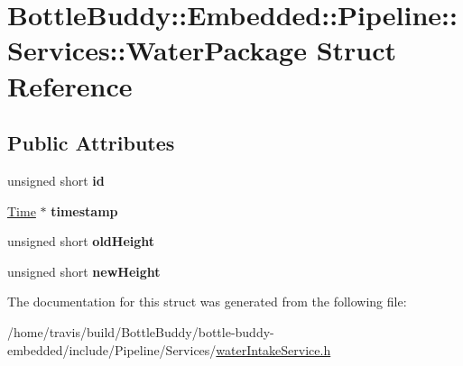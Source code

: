 \hypertarget{struct_bottle_buddy_1_1_embedded_1_1_pipeline_1_1_services_1_1_water_package}{}\section{Bottle\+Buddy\+:\+:Embedded\+:\+:Pipeline\+:\+:Services\+:\+:Water\+Package Struct Reference}
\label{struct_bottle_buddy_1_1_embedded_1_1_pipeline_1_1_services_1_1_water_package}
\subsection*{Public Attributes}
\begin{DoxyCompactItemize}
\item 
unsigned short {\bfseries id}\hypertarget{struct_bottle_buddy_1_1_embedded_1_1_pipeline_1_1_services_1_1_water_package_ae73a2f28e310cd2d842b18610f0e8c02}{}\label{struct_bottle_buddy_1_1_embedded_1_1_pipeline_1_1_services_1_1_water_package_ae73a2f28e310cd2d842b18610f0e8c02}

\item 
\hyperlink{struct_bottle_buddy_1_1_embedded_1_1_pipeline_1_1_services_1_1_time}{Time} $\ast$ {\bfseries timestamp}\hypertarget{struct_bottle_buddy_1_1_embedded_1_1_pipeline_1_1_services_1_1_water_package_a2184abfff14e71c5301a4590bb553443}{}\label{struct_bottle_buddy_1_1_embedded_1_1_pipeline_1_1_services_1_1_water_package_a2184abfff14e71c5301a4590bb553443}

\item 
unsigned short {\bfseries old\+Height}\hypertarget{struct_bottle_buddy_1_1_embedded_1_1_pipeline_1_1_services_1_1_water_package_a4a5e2f79dc583245575105370aee3c2a}{}\label{struct_bottle_buddy_1_1_embedded_1_1_pipeline_1_1_services_1_1_water_package_a4a5e2f79dc583245575105370aee3c2a}

\item 
unsigned short {\bfseries new\+Height}\hypertarget{struct_bottle_buddy_1_1_embedded_1_1_pipeline_1_1_services_1_1_water_package_acc73e8c93e6ac9b0247b5a6be0cdedf6}{}\label{struct_bottle_buddy_1_1_embedded_1_1_pipeline_1_1_services_1_1_water_package_acc73e8c93e6ac9b0247b5a6be0cdedf6}

\end{DoxyCompactItemize}


The documentation for this struct was generated from the following file\+:\begin{DoxyCompactItemize}
\item 
/home/travis/build/\+Bottle\+Buddy/bottle-\/buddy-\/embedded/include/\+Pipeline/\+Services/\hyperlink{water_intake_service_8h}{water\+Intake\+Service.\+h}\end{DoxyCompactItemize}
